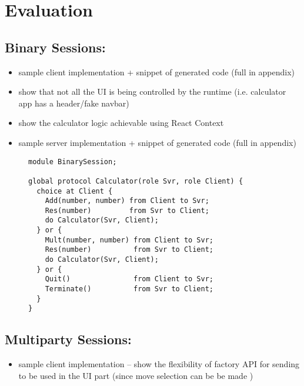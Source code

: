 \chapter{Evaluation}
\label{chap:eval}

\section{Binary Sessions: }
\label{section:evalcalculator}
\begin{itemize}
\item sample client implementation + snippet of generated code (full in appendix)
\item show that not all the UI is being controlled by the runtime (i.e. calculator app has a header/fake navbar)
\item show the calculator logic achievable using React Context
\item sample server implementation + snippet of generated code (full in appendix)
\end{itemize}

\begin{figure}[!ht]
\begin{lstlisting}[language=Scribble, tabsize=2]
module BinarySession;

global protocol Calculator(role Svr, role Client) {
  choice at Client {
    Add(number, number) from Client to Svr;
    Res(number)         from Svr to Client;
    do Calculator(Svr, Client);
  } or {
    Mult(number, number) from Client to Svr;
    Res(number)          from Svr to Client;
    do Calculator(Svr, Client);
  } or {
    Quit()               from Client to Svr;
    Terminate()          from Svr to Client;
  }
}
\end{lstlisting}
\label{lst:calculator}
\end{figure}

\section{Multiparty Sessions: }
\label{section:evalgame}
\begin{itemize}
\item sample client implementation -- show the flexibility of factory API for sending to be used in the UI part (since move selection can be be made )
\end{itemize}

